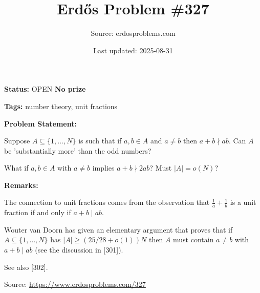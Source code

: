\documentclass{article}
\title{Erd\H{o}s Problem \#327}
\date{Last updated: 2025-08-31}
\author{Source: erdosproblems.com}
\begin{document}
\maketitle

\noindent\textbf{Status:} OPEN \quad \textbf{No prize}

\noindent\textbf{Tags:} number theory, unit fractions

\medskip
\noindent\textbf{Problem Statement:}

Suppose $A\subseteq \{1,\ldots,N\}$ is such that if $a,b\in A$ and $a\neq b$ then $a+b\nmid ab$. Can $A$ be 'substantially more' than the odd numbers?

What if $a,b\in A$ with $a\neq b$ implies $a+b\nmid 2ab$? Must $\lvert A\rvert=o(N)$?

\bigskip
\noindent\textbf{Remarks:}

The connection to unit fractions comes from the observation that $\frac{1}{a}+\frac{1}{b}$ is a unit fraction if and only if $a+b\mid ab$.

Wouter van Doorn has given an elementary argument that proves that if $A\subseteq \{1,\ldots,N\}$ has $\lvert A\rvert \geq (25/28+o(1))N$ then $A$ must contain $a\neq b$ with $a+b\mid ab$ (see the discussion in [301]).

See also [302].

\bigskip
\noindent\small{Source: \url{https://www.erdosproblems.com/327}}
\end{document}

